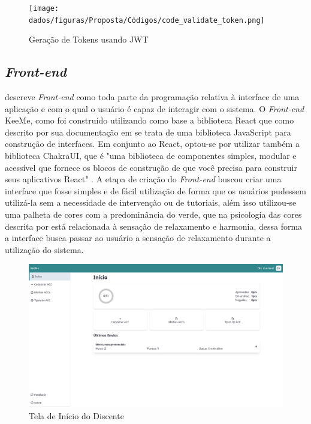 \begin{figure}[H]
    \centering
    \texttt{[image: dados/figuras/Proposta/Códigos/code\_validate\_token.png]}
    \caption{Geração de Tokens usando JWT}
    \label{fig:codigoValidadorDeToken}
\end{figure}


\subsection{\textit{Front-end}}

\cite{roveda2018frontend} descreve \textit{\textit{Front-end}} como toda parte da programação relativa à interface de uma aplicação e com o qual o usuário é capaz de interagir com o sistema. O \textit{\textit{Front-end}} KeeMe, como foi construído utilizando como base a biblioteca React que como descrito por sua documentação em \cite{react} se trata de uma biblioteca JavaScript para construção de interfaces. Em conjunto ao React, optou-se por utilizar também a biblioteca ChakraUI, que é "uma biblioteca de componentes simples, modular e acessível que fornece os blocos de construção de que você precisa para construir seus aplicativos React" \cite{chakraui}. A etapa de criação do \textit{\textit{Front-end}} buscou criar uma interface que fosse simples e de fácil utilização de forma que os usuários pudessem utilizá-la sem a necessidade de intervenção ou de tutoriais, além isso utilizou-se uma palheta de cores com a predominância do verde, que na psicologia das cores descrita por \cite{clemente2020cores} está relacionada à sensação de relaxamento e harmonia, dessa forma a interface busca passar ao usuário a sensação de relaxamento durante a utilização do sistema.

\begin{figure}[H]
    \centering
    \includegraphics[width=\textwidth]{dados/figuras/Proposta/Screens/student_dashboard.png}
    \caption{Tela de Início do Discente}
    \label{fig:screenDashboardDiscente}
\end{figure}

